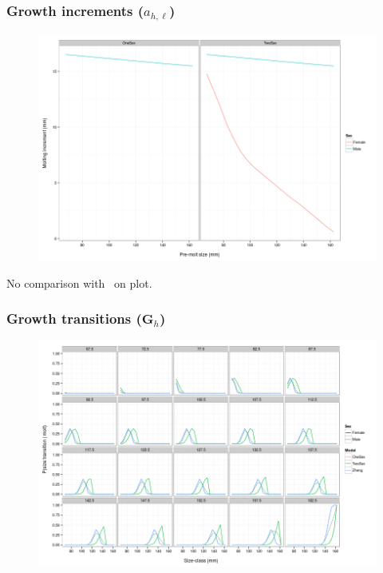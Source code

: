 \documentclass{beamer}
\begin{document}
\begin{frame}
\frametitle{Growth increments ($a_{h,\ell}$)}
\begin{figure}[!htbp]
  \centering
  \includegraphics[width=0.75\linewidth]{figure/growth_inc-1.png}
\end{figure}
No comparison with~\citet{zheng_bristol_2015} on plot.
\end{frame}


\begin{frame}
\frametitle{Growth transitions ($\boldsymbol{G}_h$)}
\begin{figure}[!htbp]
  \centering
  \includegraphics[width=0.75\linewidth]{figure/growth_trans-1.png}
\end{figure}
\end{frame}

\end{document}
